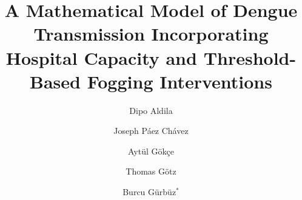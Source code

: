 \documentclass[preprint]{elsarticle}
\begin{document}
\begin{frontmatter}
\title{A Mathematical Model of Dengue Transmission Incorporating Hospital Capacity and Threshold-Based Fogging Interventions}


\author[IND]{Dipo Aldila}
\address[IND]{Department of Mathematics, Faculty of Mathematics and Natural Sciences, Universitas Indonesia, Depok 16424, Indonesia.}
%
\author[ESPOL,CFD]{Joseph P\'aez Ch\'avez}
\address[ESPOL]{Center for Applied Dynamical Systems and Computational Methods (CADSCOM), Faculty of Natural Sciences and Mathematics, Escuela Superior Polit\'ecnica del Litoral, P.O. Box 09-01-5863, Guayaquil, Ecuador}
\address[CFD]{Center for Dynamics, Department of Mathematics, TU Dresden, D-01062 Dresden, Germany.}
%
\author[UOrdu]{Aytül Gökçe}
\address[UOrdu]{Department of Mathematics, Faculty of Science and Letters, Ordu University, 52200 Ordu, Türkiye}
%
\author[UKO]{Thomas Götz}
\address[UKO]{Mathematical Insitute, University of Koblenz, 56070 Koblenz, Germany}
%
\author[JGU,IQCB]{Burcu Gürbüz$^*$}
\address[JGU]{Institute of Mathematics, Johannes--Gutenberg Universität Mainz, 55099 Mainz, Germany}
\address[IQCB]{Institute for Quantitative and Computational Biosciences (IQCB), Johannes Gutenberg University Mainz, 55128 Mainz, Germany}


\end{frontmatter}
\end{document}
